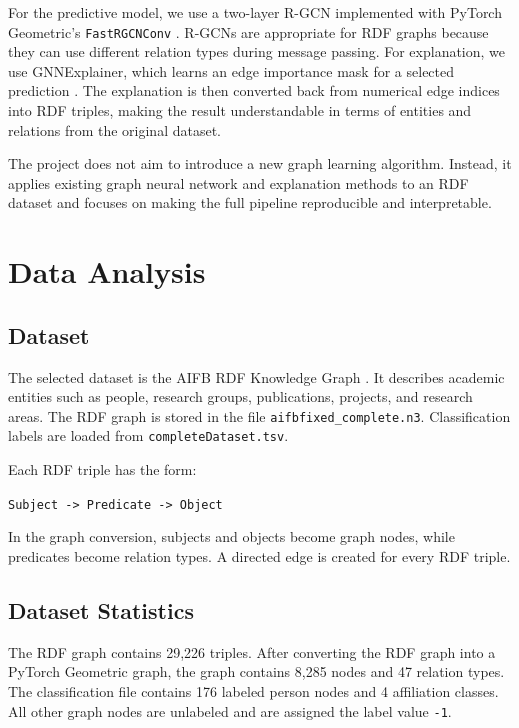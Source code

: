 \documentclass[runningheads]{llncs}
\begin{document}
For the predictive model, we use a two-layer R-GCN implemented with PyTorch Geometric's \texttt{FastRGCNConv} \cite{rgcn,pyg,pygdocs}. R-GCNs are appropriate for RDF graphs because they can use different relation types during message passing. For explanation, we use GNNExplainer, which learns an edge importance mask for a selected prediction \cite{gnnexplainer,pygexplainerdocs}. The explanation is then converted back from numerical edge indices into RDF triples, making the result understandable in terms of entities and relations from the original dataset.

The project does not aim to introduce a new graph learning algorithm. Instead, it applies existing graph neural network and explanation methods to an RDF dataset and focuses on making the full pipeline reproducible and interpretable.

\section{Data Analysis}

\subsection{Dataset}

The selected dataset is the AIFB RDF Knowledge Graph \cite{aifb}. It describes academic entities such as people, research groups, publications, projects, and research areas. The RDF graph is stored in the file \texttt{aifbfixed\_complete.n3}. Classification labels are loaded from \texttt{completeDataset.tsv}.

Each RDF triple has the form:

\begin{center}
\texttt{Subject -> Predicate -> Object}
\end{center}

In the graph conversion, subjects and objects become graph nodes, while predicates become relation types. A directed edge is created for every RDF triple.

\subsection{Dataset Statistics}

The RDF graph contains 29,226 triples. After converting the RDF graph into a PyTorch Geometric graph, the graph contains 8,285 nodes and 47 relation types. The classification file contains 176 labeled person nodes and 4 affiliation classes. All other graph nodes are unlabeled and are assigned the label value \texttt{-1}.
\end{document}
